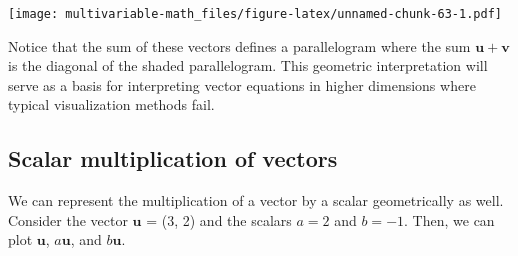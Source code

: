\documentclass[
]{book}
\newenvironment{Shaded}{\begin{snugshade}}{\end{snugshade}}
\newcommand{\DataTypeTok}[1]{\textcolor[rgb]{0.13,0.29,0.53}{#1}}
\newcommand{\DecValTok}[1]{\textcolor[rgb]{0.00,0.00,0.81}{#1}}
\newcommand{\FloatTok}[1]{\textcolor[rgb]{0.00,0.00,0.81}{#1}}
\newcommand{\KeywordTok}[1]{\textcolor[rgb]{0.13,0.29,0.53}{\textbf{#1}}}
\newcommand{\NormalTok}[1]{#1}
\newcommand{\OperatorTok}[1]{\textcolor[rgb]{0.81,0.36,0.00}{\textbf{#1}}}
\newcommand{\StringTok}[1]{\textcolor[rgb]{0.31,0.60,0.02}{#1}}
\theoremstyle{definition}
\theoremstyle{definition}
\theoremstyle{definition}
\theoremstyle{definition}
\theoremstyle{remark}
\begin{document}
\texttt{[image: multivariable-math\_files/figure-latex/unnamed-chunk-63-1.pdf]}

Notice that the sum of these vectors defines a parallelogram where the sum \(\mathbf{u} + \mathbf{v}\) is the diagonal of the shaded parallelogram. This geometric interpretation will serve as a basis for interpreting vector equations in higher dimensions where typical visualization methods fail.

\hypertarget{scalar-multiplication-of-vectors}{%
\subsection{Scalar multiplication of vectors}\label{scalar-multiplication-of-vectors}}

We can represent the multiplication of a vector by a scalar geometrically as well. Consider the vector \(\mathbf{u}\) = (3, 2) and the scalars \(a = 2\) and \(b = -1\). Then, we can plot \(\mathbf{u}\), \(a\mathbf{u}\), and \(b\mathbf{u}\).

\begin{Shaded}
\end{Shaded}
\end{document}
